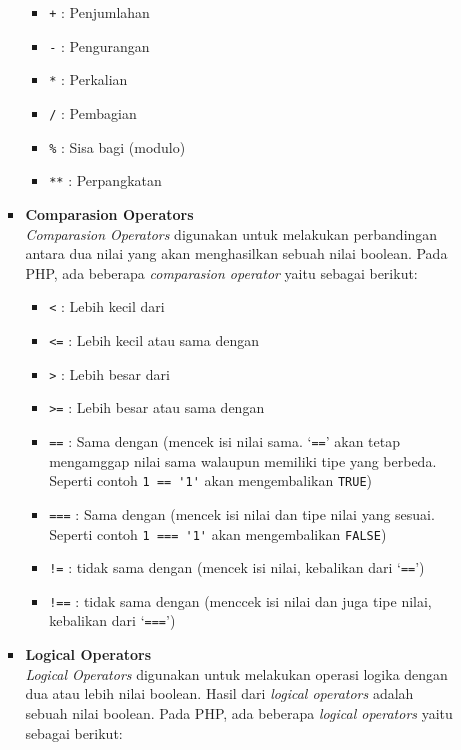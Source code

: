\documentclass[a4paper,twoside]{article}
\begin{document}
\begin{enumerate}
\begin{itemize}
\begin{itemize}
			                  \begin{itemize}
				                  \item \verb|+| : Penjumlahan
				                  \item \verb|-| : Pengurangan
				                  \item \verb|*| : Perkalian
				                  \item \verb|/| : Pembagian
				                  \item \verb|%| : Sisa bagi (modulo)
				                  \item \verb|**| : Perpangkatan
			                  \end{itemize}

			            \item \textbf{Comparasion Operators} \\
			                  \textit{Comparasion Operators} digunakan untuk melakukan perbandingan antara dua nilai yang akan menghasilkan sebuah nilai boolean. Pada PHP, ada beberapa \textit{comparasion operator} yaitu sebagai berikut:

			                  \begin{itemize}
				                  \item \verb|<| : Lebih kecil dari
				                  \item \verb|<=| : Lebih kecil atau sama dengan
				                  \item \verb|>| : Lebih besar dari
				                  \item \verb|>=| : Lebih besar atau sama dengan
				                  \item \verb|==| : Sama dengan (mencek isi nilai sama. `\verb|==|' akan tetap mengamggap nilai sama walaupun memiliki tipe yang berbeda. Seperti contoh \verb|1 == '1'| akan mengembalikan \verb|TRUE|)
				                  \item \verb|===| : Sama dengan (mencek isi nilai dan tipe nilai yang sesuai. Seperti contoh \verb|1 === '1'| akan mengembalikan \verb|FALSE|)
				                  \item \verb|!=| : tidak sama dengan (mencek isi nilai, kebalikan dari `\verb|==|')
				                  \item \verb|!==| : tidak sama dengan (menccek isi nilai dan juga tipe nilai, kebalikan dari `\verb|===|')
			                  \end{itemize}

			            \item \textbf{Logical Operators} \\
			                  \textit{Logical Operators} digunakan untuk melakukan operasi logika dengan dua atau lebih nilai boolean. Hasil dari \textit{logical operators} adalah sebuah nilai boolean. Pada PHP, ada beberapa \textit{logical operators} yaitu sebagai berikut:


\end{itemize}
\end{itemize}
\end{enumerate}
\end{document}

